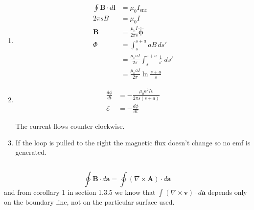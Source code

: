 \documentclass{article}
\renewcommand{\vec}[1]{\boldsymbol{\mathbf{#1}}}
\newcommand{\uvec}[1]{\hat{\vec{#1}}}
\begin{document}
\subsection{}

\begin{enumerate}
  \item

        \begin{align*}
          \oint \vec{B} \cdot d \vec{l} & = \mu_0 I_\text{enc}                                         \\
          2 \pi s B                     & = \mu_0 I                                                    \\
          \vec{B}                       & = \frac{\mu_0 I}{2 \pi s} \uvec{\phi}                        \\
          \Phi                          & = \int_s^{s + a} a B \,d s'                                  \\
                                        & = \frac{\mu_0 a I}{2 \pi} \int_s^{s + a} \frac{1}{s'} \,d s' \\
                                        & = \frac{\mu_0 a I}{2 \pi} \ln \frac{s + a}{s}
        \end{align*}

  \item

        \begin{align*}
          \frac{d \phi}{d t} & = -\frac{\mu_0 a^2 I v}{2 \pi s (s + a)} \\
          \mathcal{E}        & = -\frac{d \phi}{d t}
        \end{align*}

        The current flows counter-clockwise.

  \item If the loop is pulled to the right the magnetic flux doesn't change so no emf is generated.
\end{enumerate}

\subsection{}

\[\oint \vec{B} \cdot d \vec{a} = \oint (\nabla \times \vec{A}) \cdot d \vec{a}\] and from corollary 1 in section 1.3.5 we know that $\int (\nabla \times \vec{v}) \cdot d \vec{a}$ depends only on the boundary line, not on the particular surface used.

\subsection{}
\end{document}
